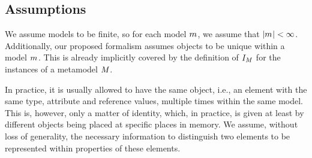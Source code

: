 




\subsection{Assumptions}
\label{chap:networks:models:assumption}

We assume models to be finite, so for each model $\model{m}{}$, we assume that $|\model{m}{}| < \infty$.
Additionally, our proposed formalism assumes objects to be unique within a model $\model{m}{}$. 
This is already implicitly covered by the definition of $\metamodelinstanceset{M}{}$ for the instances of a metamodel $\metamodel{M}{}$. 

In practice, it is usually allowed to have the same object, i.e., an element with the same type, attribute and reference values, multiple times within the same model. 
This is, however, only a matter of identity, which, in practice, is given at least by different objects being placed at specific places in memory.
We assume, without loss of generality, the necessary information to distinguish two elements to be represented within properties of these elements.

